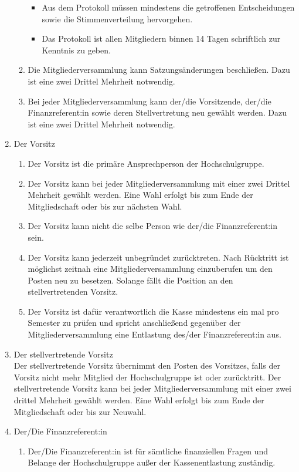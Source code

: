\documentclass[11pt]{article}
\begin{document}
\begin{enumerate}
\begin{enumerate}
\begin{itemize}
                \item Aus dem Protokoll müssen mindestens die getroffenen Entscheidungen sowie die Stimmenverteilung hervorgehen.
                \item Das Protokoll ist allen Mitgliedern binnen 14 Tagen schriftlich zur Kenntnis zu geben.
            \end{itemize}
			\item Die Mitgliederversammlung kann Satzungsänderungen beschließen. Dazu ist eine zwei Drittel Mehrheit notwendig.
			\item Bei jeder Mitgliederversammlung kann der/die Vorsitzende, der/die Finanzreferent:in sowie deren Stellvertretung neu gewählt werden. Dazu ist eine zwei Drittel Mehrheit notwendig. 
		\end{enumerate}
		\item Der Vorsitz
		\begin{enumerate}
			\item Der Vorsitz ist die primäre Ansprechperson der Hochschulgruppe.
			\item Der Vorsitz kann bei jeder Mitgliederversammlung mit einer zwei Drittel Mehrheit gewählt werden. Eine Wahl erfolgt bis zum Ende der Mitgliedschaft oder bis zur nächsten Wahl.
			\item Der Vorsitz kann nicht die selbe Person wie der/die Finanzreferent:in sein.
			\item Der Vorsitz kann jederzeit unbegründet zurücktreten. Nach Rücktritt ist möglichst zeitnah eine Mitgliederversammlung einzuberufen um den Posten neu zu besetzen. Solange fällt die Position an den stellvertretenden Vorsitz.
			\item Der Vorsitz ist dafür verantwortlich die Kasse mindestens ein mal pro Semester zu prüfen und spricht anschließend gegenüber der Mitgliederversammlung eine Entlastung des/der Finanzreferent:in aus.
		\end{enumerate}
		\item Der stellvertretende Vorsitz\\
			Der stellvertretende Vorsitz übernimmt den Posten des Vorsitzes, falls der Vorsitz nicht mehr Mitglied der Hochschulgruppe ist oder zurücktritt. Der stellvertretende Vorsitz kann bei jeder Mitgliederversammlung mit einer zwei drittel Mehrheit gewählt werden. Eine Wahl erfolgt bis zum Ende der Mitgliedschaft oder bis zur Neuwahl.
		\item Der/Die Finanzreferent:in
		\begin{enumerate}
			\item Der/Die Finanzreferent:in ist für sämtliche finanziellen Fragen und Belange der Hochschulgruppe außer der Kassenentlastung zuständig.

\end{enumerate}
\end{enumerate}
\end{document}
